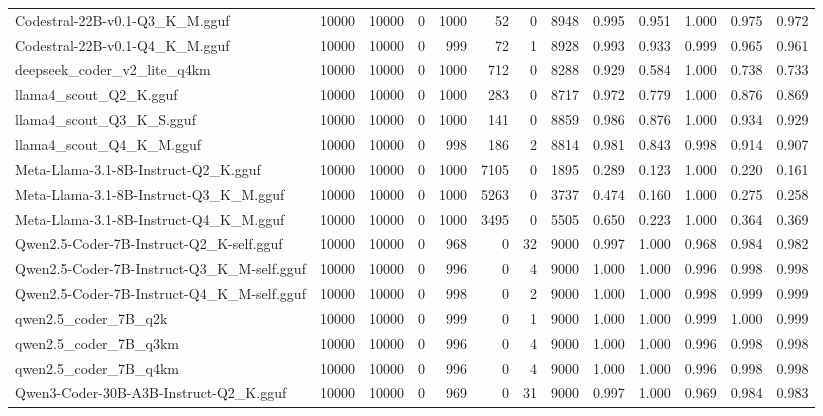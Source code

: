 \begin{table}[htbp]
{\begin{tabular}{lrrrrrrrrrrrr}
    Codestral-22B-v0.1-Q3\_K\_M.gguf & 10000 & 10000 & 0 & 1000 & 52 & 0 & 8948 & 0.995 & 0.951 & 1.000 & 0.975 & 0.972 \\
    Codestral-22B-v0.1-Q4\_K\_M.gguf & 10000 & 10000 & 0 & 999 & 72 & 1 & 8928 & 0.993 & 0.933 & 0.999 & 0.965 & 0.961 \\
    deepseek\_coder\_v2\_lite\_q4km & 10000 & 10000 & 0 & 1000 & 712 & 0 & 8288 & 0.929 & 0.584 & 1.000 & 0.738 & 0.733 \\
    llama4\_scout\_Q2\_K.gguf & 10000 & 10000 & 0 & 1000 & 283 & 0 & 8717 & 0.972 & 0.779 & 1.000 & 0.876 & 0.869 \\
    llama4\_scout\_Q3\_K\_S.gguf & 10000 & 10000 & 0 & 1000 & 141 & 0 & 8859 & 0.986 & 0.876 & 1.000 & 0.934 & 0.929 \\
    llama4\_scout\_Q4\_K\_M.gguf & 10000 & 10000 & 0 & 998 & 186 & 2 & 8814 & 0.981 & 0.843 & 0.998 & 0.914 & 0.907 \\
    Meta-Llama-3.1-8B-Instruct-Q2\_K.gguf & 10000 & 10000 & 0 & 1000 & 7105 & 0 & 1895 & 0.289 & 0.123 & 1.000 & 0.220 & 0.161 \\
    Meta-Llama-3.1-8B-Instruct-Q3\_K\_M.gguf & 10000 & 10000 & 0 & 1000 & 5263 & 0 & 3737 & 0.474 & 0.160 & 1.000 & 0.275 & 0.258 \\
    Meta-Llama-3.1-8B-Instruct-Q4\_K\_M.gguf & 10000 & 10000 & 0 & 1000 & 3495 & 0 & 5505 & 0.650 & 0.223 & 1.000 & 0.364 & 0.369 \\
    Qwen2.5-Coder-7B-Instruct-Q2\_K-self.gguf & 10000 & 10000 & 0 & 968 & 0 & 32 & 9000 & 0.997 & 1.000 & 0.968 & 0.984 & 0.982 \\
    Qwen2.5-Coder-7B-Instruct-Q3\_K\_M-self.gguf & 10000 & 10000 & 0 & 996 & 0 & 4 & 9000 & 1.000 & 1.000 & 0.996 & 0.998 & \cellcolor{green!20}0.998 \\
    Qwen2.5-Coder-7B-Instruct-Q4\_K\_M-self.gguf & 10000 & 10000 & 0 & 998 & 0 & 2 & 9000 & 1.000 & 1.000 & 0.998 & 0.999 & \cellcolor{green!40}0.999 \\
    qwen2.5\_coder\_7B\_q2k & 10000 & 10000 & 0 & 999 & 0 & 1 & 9000 & 1.000 & 1.000 & 0.999 & 1.000 & \cellcolor{green!50}0.999 \\
    qwen2.5\_coder\_7B\_q3km & 10000 & 10000 & 0 & 996 & 0 & 4 & 9000 & 1.000 & 1.000 & 0.996 & 0.998 & \cellcolor{green!10}0.998 \\
    qwen2.5\_coder\_7B\_q4km & 10000 & 10000 & 0 & 996 & 0 & 4 & 9000 & 1.000 & 1.000 & 0.996 & 0.998 & 0.998 \\
    Qwen3-Coder-30B-A3B-Instruct-Q2\_K.gguf & 10000 & 10000 & 0 & 969 & 0 & 31 & 9000 & 0.997 & 1.000 & 0.969 & 0.984 & 0.983 \\

\end{tabular}}
\end{table}
